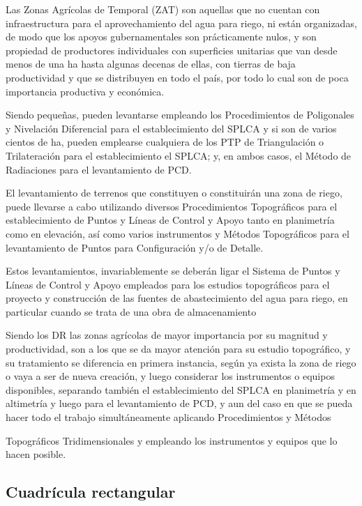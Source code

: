       Las Zonas Agrícolas de Temporal (ZAT) son aquellas que no cuentan con infraestructura para el aprovechamiento del agua para riego, ni están organizadas, de modo que los apoyos gubernamentales son prácticamente nulos, y son propiedad de productores individuales con superficies unitarias que van desde menos de una ha hasta algunas decenas de ellas, con tierras de baja productividad y que se distribuyen en todo el país, por todo lo cual son de poca importancia productiva y económica.
      
      Siendo pequeñas, pueden levantarse empleando los Procedimientos de Poligonales y Nivelación Diferencial para el establecimiento del SPLCA y si son de varios cientos de ha, pueden emplearse cualquiera de los PTP de Triangulación o Trilateración para el establecimiento el SPLCA; y, en ambos casos, el Método de Radiaciones para el levantamiento de PCD.
      
      El levantamiento de terrenos que constituyen o constituirán una zona de riego, puede llevarse a cabo utilizando diversos Procedimientos Topográficos para el establecimiento de Puntos y Líneas de Control y Apoyo tanto en planimetría como en elevación, así como varios instrumentos y Métodos Topográficos para el levantamiento de Puntos para Configuración y/o de Detalle.
      
      Estos levantamientos, invariablemente se deberán ligar el Sistema de Puntos y Líneas de Control y Apoyo empleados para los estudios topográficos para el proyecto y construcción de las fuentes de abastecimiento del agua para riego, en particular cuando se trata de una obra de almacenamiento
      
      Siendo los DR las zonas agrícolas de mayor importancia por su magnitud y productividad, son a los que se da mayor atención para su estudio topográfico, y su tratamiento se diferencia en primera instancia, según ya exista la zona de riego o vaya a ser de nueva creación, y luego considerar los instrumentos o equipos disponibles, separando también el establecimiento del SPLCA en planimetría y en altimetría y luego para el levantamiento de PCD, y aun del caso en que se pueda hacer todo el trabajo simultáneamente aplicando Procedimientos y Métodos
      
      Topográficos Tridimensionales y empleando los instrumentos y equipos que lo hacen posible.
      
      \subsection{Cuadrícula rectangular}
      
